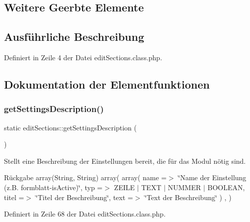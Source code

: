 \subsection*{Weitere Geerbte Elemente}


\subsection{Ausführliche Beschreibung}


Definiert in Zeile 4 der Datei edit\+Sections.\+class.\+php.



\subsection{Dokumentation der Elementfunktionen}
\mbox{\label{classedit_sections_a23c63defcab63087e6a6a3b176a04753}} 
\subsubsection{\texorpdfstring{get\+Settings\+Description()}{getSettingsDescription()}}
{\footnotesize\ttfamily static edit\+Sections\+::get\+Settings\+Description (\begin{DoxyParamCaption}{ }\end{DoxyParamCaption})\hspace{0.3cm}{\ttfamily [static]}}

Stellt eine Beschreibung der Einstellungen bereit, die für das Modul nötig sind. \begin{DoxyReturn}{Rückgabe}
array(\+String, String) array( array( \textquotesingle{}name\textquotesingle{} =$>$ \char`\"{}\+Name der Einstellung (z.\+B. formblatt-\/is\+Active)\char`\"{}, \textquotesingle{}typ\textquotesingle{} =$>$ Z\+E\+I\+LE $\vert$ T\+E\+XT $\vert$ N\+U\+M\+M\+ER $\vert$ B\+O\+O\+L\+E\+AN, \textquotesingle{}titel\textquotesingle{} =$>$ \char`\"{}\+Titel der Beschreibung\char`\"{}, \textquotesingle{}text\textquotesingle{} =$>$ \char`\"{}\+Text der Beschreibung\char`\"{} ) , ) 
\end{DoxyReturn}


Definiert in Zeile 68 der Datei edit\+Sections.\+class.\+php.

\mbox{\label{classedit_sections_a8a701b162fbc736eb49b94253fd021dc}} 
